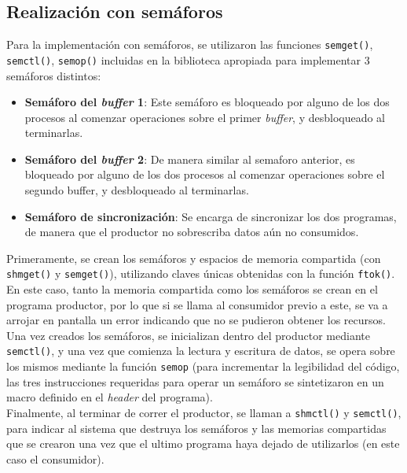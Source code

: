 \subsection{Realización con semáforos}

Para la implementación con semáforos, se utilizaron las funciones \texttt{semget()}, \texttt{semctl()}, \texttt{semop()} incluidas en la biblioteca apropiada para implementar 3 semáforos distintos:

\begin{itemize}
    \item \textbf{Semáforo del \textit{buffer} 1}: Este semáforo es bloqueado por alguno de los dos procesos al comenzar operaciones sobre el primer \textit{buffer}, y desbloqueado al terminarlas.
    \item \textbf{Semáforo del \textit{buffer} 2}: De manera similar al semaforo anterior, es bloqueado por alguno de los dos procesos al comenzar operaciones sobre el segundo buffer, y desbloqueado al terminarlas.
    \item \textbf{Semáforo de sincronización}: Se encarga de sincronizar los dos programas, de manera que el productor no sobrescriba datos aún no consumidos.
\end{itemize}

Primeramente, se crean los semáforos y espacios de memoria compartida (con \texttt{shmget()} y \texttt{semget()}), utilizando claves únicas obtenidas con la función \texttt{ftok()}. En este caso, tanto la memoria compartida como los semáforos se crean en el programa productor, por lo que si se llama al consumidor previo a este, se va a arrojar en pantalla un error indicando que no se pudieron obtener los recursos.\\

Una vez creados los semáforos, se inicializan dentro del productor mediante \texttt{semctl()}, y una vez que comienza la lectura y escritura de datos, se opera sobre los mismos mediante la función \texttt{semop} (para incrementar la legibilidad del código, las tres instrucciones requeridas para operar un semáforo se sintetizaron en un macro definido en el \textit{header} del programa).\\

Finalmente, al terminar de correr el productor, se llaman a \texttt{shmctl()} y \texttt{semctl()}, para indicar al sistema que destruya los semáforos y las memorias compartidas que se crearon una vez que el ultimo programa haya dejado de utilizarlos (en este caso el consumidor).\\

